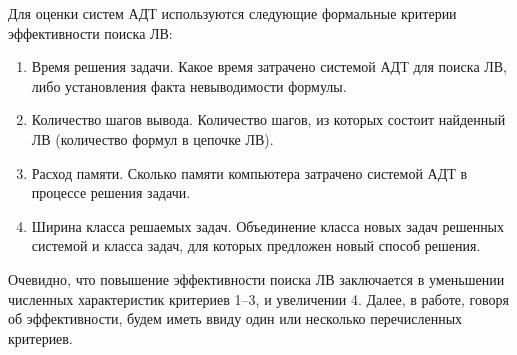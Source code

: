 
Для оценки систем АДТ используются следующие формальные критерии эффективности поиска ЛВ:
\label{pg:criterion}
\begin{enumerate}
\item{Время решения задачи.} Какое время затрачено системой АДТ для поиска ЛВ, либо установления факта невыводимости формулы.
\item{Количество шагов вывода.} Количество шагов, из которых состоит найденный ЛВ (количество формул в цепочке ЛВ).
\item{Расход памяти.} Сколько памяти компьютера затрачено системой АДТ в процессе решения задачи.
\item{Ширина класса решаемых задач.} Объединение класса новых задач решенных системой и класса задач, для которых предложен новый способ решения.
\end{enumerate}

Очевидно, что повышение эффективности поиска ЛВ заключается в уменьшении численных характеристик критериев 1--3, и увеличении 4. Далее, в работе, говоря об эффективности, будем иметь ввиду один или несколько перечисленных критериев.


